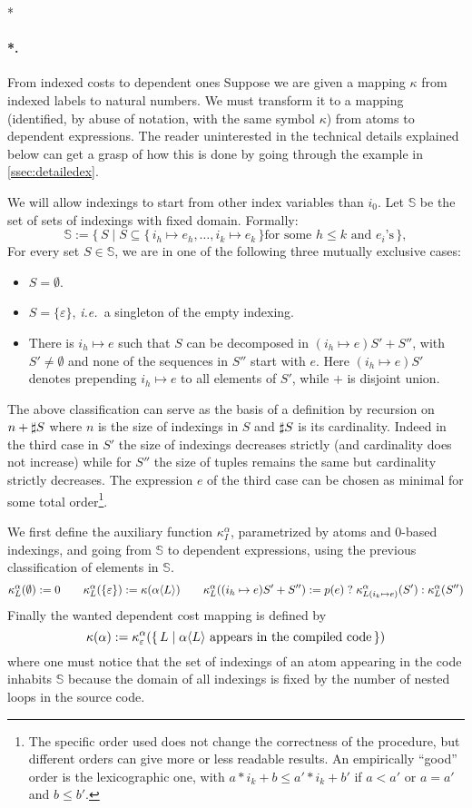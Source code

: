\documentclass[submission,copyright,creativecommons]{eptcs}
\makeatletter
\theoremstyle{definition}
\newcommand{\tern}[3]{#1\mathrel ? #2 : #3}
\newcommand{\ass}{\mathrel{:=}}
\newcommand{\setof}[1]{\{\,#1\,\}}
\newcommand{\ie}{\emph{i.e.\ }}
\let\oldparagraph\paragraph
\def\paragraph{\@ifnextchar*\new@paragraph@star\new@paragraph}
\def\new@paragraph@star*#1{\oldparagraph*{#1.}}
\def\new@paragraph#1{\oldparagraph{#1.}}
\makeatother
\begin{document}
\paragraph*{From indexed costs to dependent ones}
Suppose we are given a mapping $\kappa$ from indexed labels to natural numbers.
We must transform it to a mapping (identified, by abuse of notation, with the same symbol $\kappa$) from atoms to dependent expressions.
The reader uninterested in the technical details explained below can get a grasp of how this is done by going through the example
in \autoref{ssec:detailedex}.

We will allow indexings to start from other index variables than $i_0$.
Let $\mathbb S$ be the set of sets of indexings with fixed domain.
Formally:
$$\mathbb S\ass \setof{S \mid S\subseteq \setof{i_h\mapsto e_h,\dots,i_k\mapsto e_k}
\text{for some $h\le k$ and $e_i$'s}},$$
For every set $S\in \mathbb S$, we are in one of the following three mutually exclusive cases:
\begin{itemize}
\item
$S=\emptyset$.
\item
$S=\{\varepsilon\}$, \ie a singleton of the empty indexing.
\item
There is $i_h\mapsto e$ such that $S$ can be decomposed in $(i_h\mapsto e)S'+S''$, with $S'\neq \emptyset$ and none of the sequences in $S''$ start with $e$.
Here $(i_h\mapsto e)S'$ denotes prepending $i_h\mapsto e$ to all elements of $S'$, while $+$ is disjoint union.
\end{itemize}

The above classification can serve as the basis of a definition by recursion on $n+\sharp S$ where $n$ is the size of indexings in $S$ and $\sharp S$ is its cardinality.
Indeed in the third case in $S'$ the size of indexings decreases strictly (and cardinality does not increase) while for $S''$ the size of tuples remains the same but cardinality strictly decreases.
The expression $e$ of the third case can be chosen as minimal for some total order\footnote{The specific order used does not change the correctness of the procedure, but different orders can give more or less readable results. An empirically ``good'' order is the lexicographic one, with $a*i_k+b \le a'*i_k+b'$ if $a<a'$ or $a=a'$ and $b\le b'$.}.

We first define the auxiliary function $ \kappa^\alpha_I$, parametrized
by atoms and $0$-based indexings, and going from $\mathbb S$
to dependent expressions, using the previous classification of elements in
$\mathbb S$.
$$
\kappa^\alpha_L(\emptyset) \ass 0\qquad
\kappa^\alpha_L(\{\varepsilon\}) \ass \kappa(\alpha\la L\ra) \qquad
\kappa^\alpha_L((i_h\mapsto e)S'+S'') \ass \tern{p(e)}{\kappa^\alpha_{L(i_k\mapsto e)}(S')}{\kappa^\alpha_L(S'')}
$$
Finally the wanted dependent cost mapping is defined by
\begin{equation}
\label{eq:dependentcost}
\kappa(\alpha)\ass\kappa^\alpha_\varepsilon(\{\,L\mid \alpha\la L\ra \text{ appears in the compiled code}\,\})
\end{equation}
where one must notice that the set of indexings of an atom appearing in the code inhabits $\mathbb S$ because
the domain of all indexings is fixed by the number of nested loops in the source code.
\end{document}
